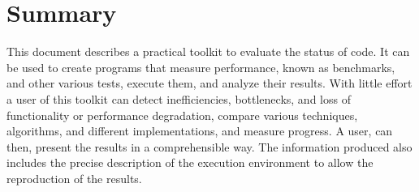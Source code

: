 \section*{Summary}
This document describes a practical toolkit to evaluate the status of code. It
can be used to create programs that measure performance, known as benchmarks,
and other various tests, execute them, and analyze their results. With little
effort a user of this toolkit can detect inefficiencies, bottlenecks, and loss
of functionality or performance degradation, compare various techniques,
algorithms, and different implementations, and measure progress. A user, can
then, present the results in a comprehensible way. The information produced
also includes the precise description of the execution environment to allow
the reproduction of the results.



